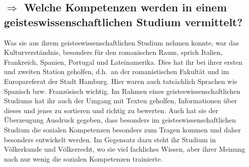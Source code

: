 \documentclass[12pt,headsepline,a4paper]{scrartcl}
\newcommand\quest[1]{\subsection*{$\Rightarrow$ #1}}
\begin{document}
\quest{Welche Kompetenzen werden in einem geisteswissenschaftlichen Studium vermittelt?}
Was sie aus ihrem geisteswissenschaftlichen Studium nehmen konnte, war das Kulturverständnis, besonders für den romanischen Raum, sprich Italien, Frankreich, Spanien, Portugal und Lateinamerika. Dies hat ihr bei ihrer ersten und zweiten Station geholfen, d.h.\ an der romanistischen Fakultät und im Europareferat der Stadt Hamburg. Hier waren auch tatsächlich Sprachen wie Spanisch bzw. Französisch wichtig.
Im Rahmen eines geisteswissenschaftlichen Studiums hat ihr auch der Umgang mit Texten geholfen, Informationen über dieses und jenes zu sortieren und richtig zu bewerten. Auch hat sie der Überzeugung Ausdruck gegeben, dass besonders im geisteswissenschaftlichen Studium die sozialen Kompetenzen besonders zum Tragen kommen und daher besonders entwickelt werden. Im Gegensatz dazu steht ihr Studium in Völkerkunde und Völkerrecht, wo sie viel fachliches Wissen, aber ihrer Meinung nach nur wenig die sozialen Kompetenzen trainierte.
\end{document}
